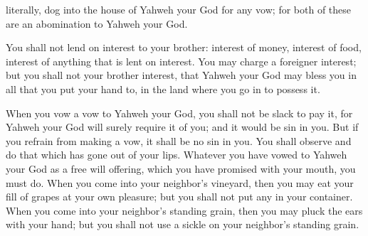 {{literally, dog} into the house of Yahweh your God for any vow; for both of these are an abomination to Yahweh your God.
\par }{\PP {}You shall not lend on interest to your brother: interest of money, interest of food, interest of anything that is lent on interest.
You may charge a foreigner interest; but you shall not your brother interest, that Yahweh your God may bless you in all that you put your hand to, in the land where you go in to possess it.
\par }{\PP {}When you vow a vow to Yahweh your God, you shall not be slack to pay it, for Yahweh your God will surely require it of you; and it would be sin in you.
But if you refrain from making a vow, it shall be no sin in you.
You shall observe and do that which has gone out of your lips. Whatever you have vowed to Yahweh your God as a free will offering, which you have promised with your mouth, you must do.
When you come into your neighbor’s vineyard, then you may eat your fill of grapes at your own pleasure; but you shall not put any in your container.
When you come into your neighbor’s standing grain, then you may pluck the ears with your hand; but you shall not use a sickle on your neighbor’s standing grain.

}
